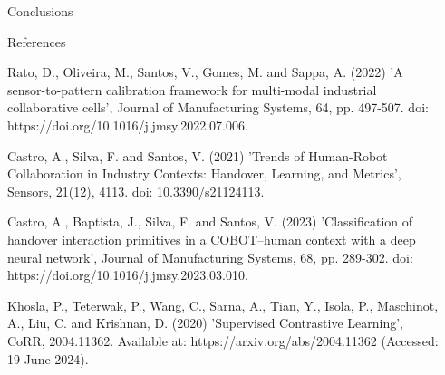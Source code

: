 \documentclass[final]{beamer}
\newlength{\sepwidth}
\newlength{\colwidth}
\newcommand{\separatorcolumn}{\begin{column}{\sepwidth}\end{column}}
\begin{document}
\begin{frame}[t]
\begin{columns}[t]
\begin{column}{\colwidth}
\begin{block}{Conclusions}
  \end{block}


  \begin{block}{References}

    \footnotesize

    Rato, D., Oliveira, M., Santos, V., Gomes, M. and Sappa, A. (2022) 'A sensor-to-pattern calibration framework for multi-modal industrial collaborative cells', Journal of Manufacturing Systems, 64, pp. 497-507. doi: https://doi.org/10.1016/j.jmsy.2022.07.006.

    Castro, A., Silva, F. and Santos, V. (2021) 'Trends of Human-Robot Collaboration in Industry Contexts: Handover, Learning, and Metrics', Sensors, 21(12), 4113. doi: 10.3390/s21124113.

    Castro, A., Baptista, J., Silva, F. and Santos, V. (2023) 'Classification of handover interaction primitives in a COBOT–human context with a deep neural network', Journal of Manufacturing Systems, 68, pp. 289-302. doi: https://doi.org/10.1016/j.jmsy.2023.03.010.

    Khosla, P., Teterwak, P., Wang, C., Sarna, A., Tian, Y., Isola, P., Maschinot, A., Liu, C. and Krishnan, D. (2020) 'Supervised Contrastive Learning', CoRR, 2004.11362. Available at: https://arxiv.org/abs/2004.11362 (Accessed: 19 June 2024).


  \end{block}

\end{column}

\separatorcolumn
\end{columns}
\end{frame}
\end{document}
